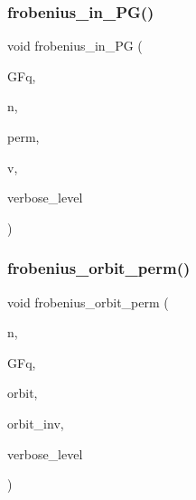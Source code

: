 \mbox{\label{group__generators_8_c_ae5cf3cf9424e4d016926a09f6dc36001}} 
\subsubsection{\texorpdfstring{frobenius\+\_\+in\+\_\+\+P\+G()}{frobenius\_in\_PG()}}
{\footnotesize\ttfamily void frobenius\+\_\+in\+\_\+\+PG (\begin{DoxyParamCaption}\item[{\mbox{\hyperlink{classfinite__field}{finite\+\_\+field}} \&}]{G\+Fq,  }\item[{\mbox{\hyperlink{galois_8h_a09fddde158a3a20bd2dcadb609de11dc}{I\+NT}}}]{n,  }\item[{\mbox{\hyperlink{galois_8h_a09fddde158a3a20bd2dcadb609de11dc}{I\+NT}} $\ast$}]{perm,  }\item[{\mbox{\hyperlink{galois_8h_a09fddde158a3a20bd2dcadb609de11dc}{I\+NT}} $\ast$}]{v,  }\item[{\mbox{\hyperlink{galois_8h_a09fddde158a3a20bd2dcadb609de11dc}{I\+NT}}}]{verbose\+\_\+level }\end{DoxyParamCaption})}

\mbox{\label{group__generators_8_c_a124056d24ceea20b62791e8f7b7dd7e3}} 
\subsubsection{\texorpdfstring{frobenius\+\_\+orbit\+\_\+perm()}{frobenius\_orbit\_perm()}}
{\footnotesize\ttfamily void frobenius\+\_\+orbit\+\_\+perm (\begin{DoxyParamCaption}\item[{\mbox{\hyperlink{galois_8h_a09fddde158a3a20bd2dcadb609de11dc}{I\+NT}}}]{n,  }\item[{\mbox{\hyperlink{classfinite__field}{finite\+\_\+field}} \&}]{G\+Fq,  }\item[{\mbox{\hyperlink{galois_8h_a09fddde158a3a20bd2dcadb609de11dc}{I\+NT}} $\ast$}]{orbit,  }\item[{\mbox{\hyperlink{galois_8h_a09fddde158a3a20bd2dcadb609de11dc}{I\+NT}} $\ast$}]{orbit\+\_\+inv,  }\item[{\mbox{\hyperlink{galois_8h_a09fddde158a3a20bd2dcadb609de11dc}{I\+NT}}}]{verbose\+\_\+level }\end{DoxyParamCaption})}

